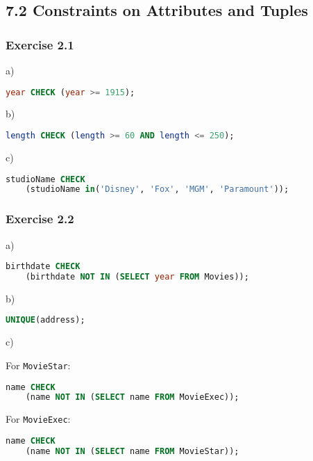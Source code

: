 \documentclass[../../main.tex]{subfiles}
\begin{document}
\subsection{7.2 Constraints on Attributes and Tuples}

\subsubsection*{Exercise 2.1}

a)

\begin{lstlisting}[language=sql]
  year CHECK (year >= 1915);
\end{lstlisting}

b)

\begin{lstlisting}[language=sql]
  length CHECK (length >= 60 AND length <= 250);
\end{lstlisting}

c)

\begin{lstlisting}[language=sql]
  studioName CHECK
    (studioName in('Disney', 'Fox', 'MGM', 'Paramount'));
\end{lstlisting}

\subsubsection*{Exercise 2.2}

a)

\begin{lstlisting}[language=sql]
  birthdate CHECK
    (birthdate NOT IN (SELECT year FROM Movies));
\end{lstlisting}

b)

\begin{lstlisting}[language=sql]
  UNIQUE(address);
\end{lstlisting}

c)

For \verb|MovieStar|:

\begin{lstlisting}[language=sql]
  name CHECK
    (name NOT IN (SELECT name FROM MovieExec));
\end{lstlisting}

For \verb|MovieExec|:

\begin{lstlisting}[language=sql]
  name CHECK
    (name NOT IN (SELECT name FROM MovieStar));
\end{lstlisting}
\end{document}
